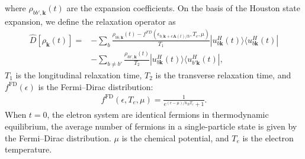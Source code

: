 where $\rho_{bb',\mathbf k}(t)$ are the expansion coefficients. On the basis of the Houston state expansion, we define the relaxation operator \cite{sato2019microscopic,PhysRevB.99.214302,sato2019light} as
\begin{align}
	\hat D\left [\rho_{\mathbf k}(t) \right ]= & -\sum_{b}\frac{\rho_{bb,\mathbf k}(t)-f^{FD}\left
	(\epsilon_{b,\mathbf k+e\mathbf A(t)/\hbar},T_e,\mu \right)}{T_1}|u^H_{b\mathbf k}(t)\rangle \langle
	u^H_{b\mathbf k}(t)|                                                                                                                                        \\
	                                           & -\sum_{b\neq b'} \frac{\rho_{bb',\mathbf k}(t)}{T_2}|u^H_{b\mathbf k}(t)\rangle \langle u^H_{b'\mathbf k}(t)|,
	\label{eqn:relaxation}
\end{align}
$T_1$ is the longitudinal relaxation time, $T_2$ is the transverse relaxation time, and
$f^{\mathrm{FD}}(\epsilon)$ is the Fermi--Dirac distribution:
\begin{align}
	f^{\mathrm{FD}}(\epsilon, T_e, \mu)=\frac{1}{e^{(\epsilon-\mu)/k_BT_e}+1}.
	\label{eq:fd-dist}
\end{align}
When $t=0$, the eletron system are identical fermions in thermodynamic equilibrium, the average number of fermions in a single-particle state is given by the Fermi–Dirac distribution. $\mu$ is the chemical potential, and $T_e$ is the electron temperature.

